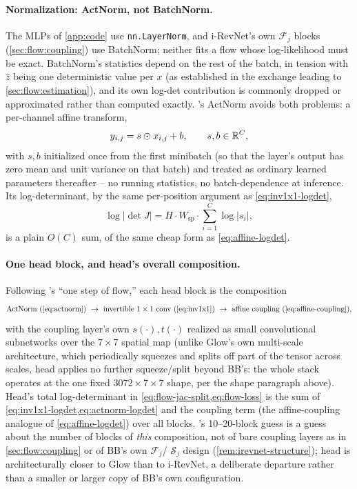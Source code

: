 \paragraph{Normalization: ActNorm, not BatchNorm.} The MLPs of \cref{app:code} use \texttt{nn.LayerNorm},
and i-RevNet's own $\mathcal F_j$ blocks (\cref{sec:flow:coupling}) use BatchNorm; neither fits a flow whose
log-likelihood must be exact. BatchNorm's statistics depend on the rest of the batch, in tension with
$\hat z$ being one deterministic value per $x$ (as established in the exchange leading to
\cref{sec:flow:estimation}), and its own log-det contribution is commonly dropped or approximated rather
than computed exactly. \cite{kingma2018glow}'s ActNorm avoids both problems: a per-channel affine transform,
\begin{equation}
y_{i,j} = s\odot x_{i,j} + b,\qquad s,b\in\mathbb{R}^{C},
\label{eq:actnorm}
\end{equation}
with $s,b$ initialized once from the first minibatch (so that the layer's output has zero mean and unit
variance on that batch) and treated as ordinary learned parameters thereafter -- no running statistics, no
batch-dependence at inference. Its log-determinant, by the same per-position argument as
\cref{eq:inv1x1-logdet},
\begin{equation}
\log\bigl|\det J\bigr| = H\cdot W_{\mathrm{sp}}\cdot\sum_{i=1}^{C}\log\bigl|s_i\bigr|,
\label{eq:actnorm-logdet}
\end{equation}
is a plain $O(C)$ sum, of the same cheap form as \cref{eq:affine-logdet}.

\paragraph{One head block, and head's overall composition.} Following \cite{kingma2018glow}'s ``one step of
flow,'' each head block is the composition
\[
\text{ActNorm (\cref{eq:actnorm})} \ \to\ \text{invertible }1\times1\text{ conv (\cref{eq:inv1x1})} \ \to\
\text{affine coupling (\cref{eq:affine-coupling})},
\]
with the coupling layer's own $s(\cdot),t(\cdot)$ realized as small convolutional subnetworks over the
$7\times7$ spatial map (unlike Glow's own multi-scale architecture, which periodically squeezes and splits
off part of the tensor across scales, head applies no further squeeze/split beyond BB's: the whole stack
operates at the one fixed $3072\times7\times7$ shape, per the shape paragraph above). Head's total
log-determinant in \cref{eq:flow-jac-split,eq:flow-loss} is the sum of \cref{eq:inv1x1-logdet,eq:actnorm-logdet} and the coupling term (the affine-coupling analogue of \cref{eq:affine-logdet}) over
all blocks. \Cref{sec:flow:depth}'s 10--20-block guess is a guess about the number of blocks of \emph{this}
composition, not of bare coupling layers as in \cref{sec:flow:coupling} or of BB's own $\mathcal F_j$/
$\mathcal S_j$ design (\cref{rem:irevnet-structure}); head is architecturally closer to Glow than to
i-RevNet, a deliberate departure rather than a smaller or larger copy of BB's own configuration.

